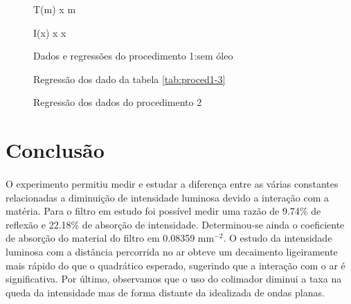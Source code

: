 \documentclass[a4paper,11pt]{article}
\begin{document}
\FloatBarrier
\begin{figure}[!htp]
		\begin{minipage}{\textwidth}
					  
					\caption{ T(m) x m}
					\label{graph:1-1-fitted}
			
		\end{minipage}			
		\vspace{2 cm}
		\begin{minipage}{\textwidth}
				
				\caption{I(x) x x}
				\label{graph:1-1-fitted2}
		\end{minipage}
		\caption{Dados e regressões do procedimento 1:sem óleo}
\end{figure}
\FloatBarrier
\FloatBarrier
\vspace{-3 cm}
\begin{figure}[!htp]
		\begin{minipage}{\textwidth}	
					  
					\caption{Regressão dos dado da tabela \ref{tab:proced1-3}}
					\label{graph:1-3-fitted}
		\end{minipage}	

		\begin{minipage}{\textwidth}
				
				\caption{Regressão dos dados do procedimento 2}
				\label{graph:2-1-fitted}
		\end{minipage}	
\end{figure}
\FloatBarrier


\newpage
\section{Conclusão}
\paragraph{}O experimento permitiu medir e estudar a diferença entre as várias constantes relacionadas a diminuição de intensidade luminosa devido a interação com a matéria. Para o filtro em estudo foi possível medir uma razão de 9.74\% de reflexão  e 22.18\% de absorção de intensidade. Determinou-se ainda o coeficiente de absorção do material do filtro em 0.08359 mm$^{-2}$. O estudo da intensidade luminosa com a distância percorrida no ar obteve um decaimento ligeiramente mais rápido do que o quadrático esperado, sugerindo que a interação com o ar é significativa. Por último, observamos que o uso do colimador diminui a taxa na queda da intensidade mas de forma distante da idealizada de ondas planas.
\end{document}
